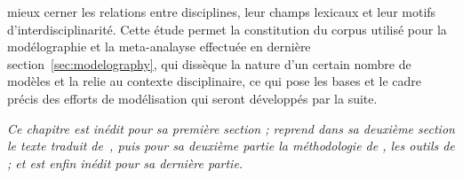 mieux cerner les relations entre disciplines, leur champs lexicaux et leur motifs d'interdisciplinarité. Cette étude permet la constitution du corpus utilisé pour la modélographie et la meta-analayse effectuée en dernière section~\ref{sec:modelography}, qui dissèque la nature d'un certain nombre de modèles et la relie au contexte disciplinaire, ce qui pose les bases et le cadre précis des efforts de modélisation qui seront développés par la suite.






\stars


\textit{Ce chapitre est inédit pour sa première section ; reprend dans sa deuxième section le texte traduit de~\cite{raimbault2015models}, puis pour sa deuxième partie la méthodologie de \cite{raimbault2016indirect}, les outils de \cite{bergeaud2017classifying}%
; et est enfin inédit pour sa dernière partie.}





